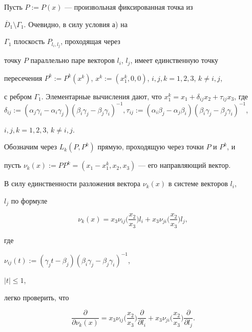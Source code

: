 \begin{pf}


Пусть $P:=P(x)$ --- произвольная фиксированная точка из


$\overline D_1 \setminus \Gamma_1$. Очевидно, в силу условия а) на


$\Gamma_1$ плоскость $P_{l_i,l_j}$, проходящая через


точку $P$ параллельно паре векторов $l_i$, $l_j$, имеет единственную точку


пересечения $P^k:=P^k(x^k)$, $x^k:=(x_1^k,0,0)$, $i,j,k=1,2,3$, $k \neq i,j$,


с ребром $\Gamma_1$. Элементарные вычисления дают, что $x_1^k=x_1+


\delta_{ij}x_2+\tau_{ij}x_3$, где $\delta_{ij}:=(\alpha_j\gamma_i-


\alpha_i\gamma_j)(\beta_i\gamma_j-\beta_j\gamma_i)^{-1},\tau_{ij}:=(\alpha_i


\beta_j-\alpha_j\beta_i)(\beta_i\gamma_j - \beta_j \gamma_i)^{-1}$,


$i,j,k=1,2,3$, $k \neq i,j$.





Обозначим через $L_k(P,P^k)$ прямую, проходящую через точки $P$ и $P^k$, и


пусть $\nu_k (x):=PP^k = (x_1 - x_1^k,x_2,x_3)$ --- его направляющий вектор.


В силу единственности разложения вектора $\nu_k(x)$ в системе векторов $l_i$,


$l_j$ по формуле


$$


\nu_k(x)=x_3\nu_{ij}\bigg (\frac{x_2}{x_3}\bigg )l_i+x_3\nu_{ji}\bigg (


\frac{x_2}{x_3}\bigg )l_j,


$$


где


$\nu_{ij}(t):=(\gamma_jt-\beta_j)(\beta_i\gamma_j-\beta_j\gamma_i)^{-1}$,


$|t|\leq 1$,


легко проверить, что


$$


\frac{\partial}{\partial \nu_k(x)}=x_3 \nu_{ij} \bigg (\frac{x_2}{x_3} \bigg)


\frac{\partial}{\partial l_i}+x_3 \nu_{ji} \bigg (\frac{x_2}{x_3} \bigg )


\frac{\partial}{\partial l_j}.


$$



\end{pf}
